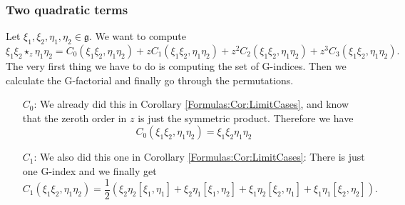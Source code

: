 \subsubsection*{Two quadratic terms}
Let $\xi_1, \xi_2, \eta_1, \eta_2 \in \mathfrak{g}$. We want to compute
\begin{equation*}
	\xi_1 \xi_2 \star_z \eta_1 \eta_2
	=
	C_0(\xi_1 \xi_2, \eta_1 \eta_2) 
	+ 
	z C_1(\xi_1 \xi_2, \eta_1 \eta_2) 
	+ 
	z^2 C_2(\xi_1 \xi_2, \eta_1 \eta_2) 
	+ 
	z^3 C_3(\xi_1 \xi_2, \eta_1 \eta_2).
\end{equation*}
The very first thing we have to do is computing the set of G-indices. Then we 
calculate the G-factorial and finally go through the permutations.
\begin{itemize}
	\item[$C_0$:]
	We already did this in Corollary \ref{Formulas:Cor:LimitCases}, and know 
	that the zeroth order in $z$ is just the symmetric product. Therefore we 
	have
	\begin{equation*}
		C_0(\xi_1 \xi_2, \eta_1 \eta_2)
		=
		\xi_1 \xi_2 \eta_1 \eta_2
	\end{equation*}
	
	\item[$C_1$:]
	We also did this one in Corollary \ref{Formulas:Cor:LimitCases}: There is 
	just one G-index and we finally get
	\begin{equation*}
		C_1(\xi_1 \xi_2, \eta_1 \eta_2)
		=
		\frac{1}{2} \left(
			\xi_2 \eta_2 [\xi_1, \eta_1] +
			\xi_2 \eta_1 [\xi_1, \eta_2] +
			\xi_1 \eta_2 [\xi_2, \eta_1] +
			\xi_1 \eta_1 [\xi_2, \eta_2]
		\right).
	\end{equation*}
	

\end{itemize}
